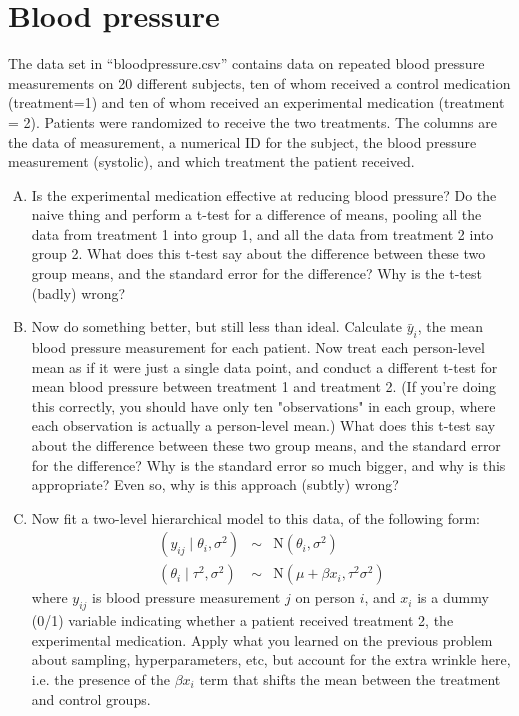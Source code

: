 \documentclass[11pt]{article}
\begin{document}
\section{Blood pressure}

The data set in ``bloodpressure.csv'' contains data on repeated blood pressure measurements on 20 different subjects, ten of whom received a control medication (treatment=1) and ten of whom received an experimental medication (treatment = 2).  Patients were randomized to receive the two treatments.  The columns are the data of measurement, a numerical ID for the subject, the blood pressure measurement (systolic), and which treatment the patient received.

\begin{enumerate}[(A)]

\item Is the experimental medication effective at reducing blood pressure?  Do the naive thing and perform a t-test for a difference of means, pooling all the data from treatment 1 into group 1, and all the data from treatment 2 into group 2.  What does this t-test say about the difference between these two group means, and the standard error for the difference?  Why is the t-test (badly) wrong?

\item Now do something better, but still less than ideal.  Calculate $\bar{y}_i$, the mean blood pressure measurement for each patient.  Now treat each person-level mean as if it were just a single data point, and conduct a different t-test for mean blood pressure between treatment 1 and treatment 2.  (If you're doing this correctly, you should have only ten "observations" in each group, where each observation is actually a person-level mean.) What does this t-test say about the difference between these two group means, and the standard error for the difference?  Why is the standard error so much bigger, and why is this appropriate?  Even so, why is this approach (subtly) wrong?  

\item Now fit a two-level hierarchical model to this data, of the following form:
\begin{eqnarray*}
(y_{ij} \mid \theta_i, \sigma^2) &\sim& \mbox{N}(\theta_i, \sigma^2) \\
(\theta_i \mid \tau^2, \sigma^2) &\sim& \mbox{N}(\mu + \beta x_i, \tau^2 \sigma^2)
\end{eqnarray*}
where $y_{ij}$ is blood pressure measurement $j$ on person $i$, and $x_i$ is a dummy (0/1) variable indicating whether a patient received treatment 2, the experimental medication.   Apply what you learned on the previous problem about sampling, hyperparameters, etc, but account for the extra wrinkle here, i.e. the presence of the $\beta x_i$ term that shifts the mean between the treatment and control groups.  


\end{enumerate}
\end{document}
